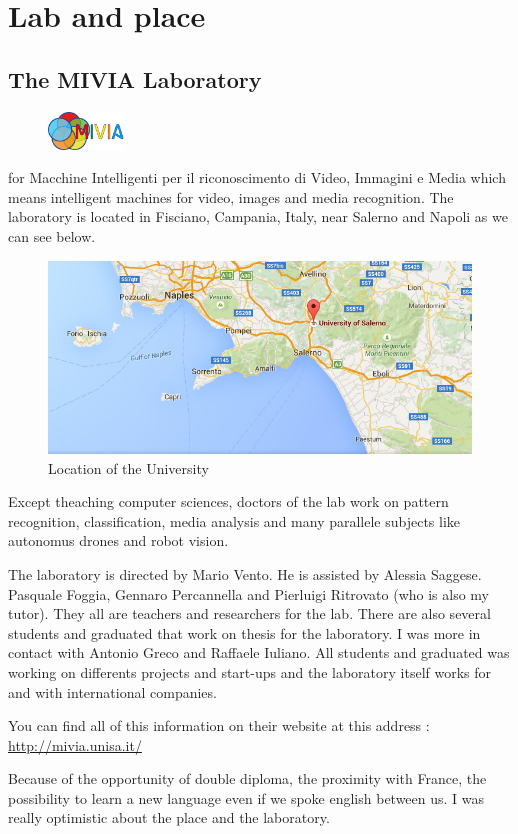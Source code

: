 \chapter{Lab and place}
\section{The MIVIA Laboratory}

\begin{figure}
	\vspace{-7mm}
	\includegraphics[width=2cm]{images_not_compressed/MIVIALogo.jpg}
	\end{figure}
 for Macchine Intelligenti per il riconoscimento di Video, Immagini e Media which means intelligent machines for video, images and media recognition. The laboratory is located in Fisciano, Campania, Italy, near Salerno and Napoli as we can see below.
 \begin{figure}[h]
 \begin{center}
	 \includegraphics[width=12cm]{images_not_compressed/geoUniversity.png}
		\caption{Location of the University}
	 \end{center}
 \end{figure}
 \par Except theaching computer sciences, doctors of the lab work on pattern recognition, classification, media analysis and many parallele subjects like autonomus drones and robot vision.
 \par The laboratory is directed by Mario Vento. He is assisted by Alessia Saggese. Pasquale Foggia, Gennaro Percannella and Pierluigi Ritrovato (who is also my tutor). They all are teachers and researchers for the lab. There are also several students and graduated that work on thesis for the laboratory. I was more in contact with Antonio Greco and Raffaele Iuliano. All students and graduated was working on differents projects and start-ups and the laboratory itself works for and with international companies.
 \par You can find all of this information on their website at this address : \url{http://mivia.unisa.it/}
 \par Because of the opportunity of double diploma, the proximity with France, the possibility to learn a new language even if we spoke english between us. I was really optimistic about the place and the laboratory.
	 

